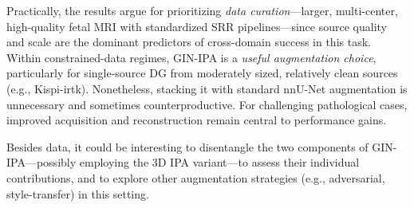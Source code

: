 Practically, the results argue for prioritizing \emph{data curation}---larger, multi-center, high-quality fetal MRI with standardized SRR pipelines---since source quality and scale are the dominant predictors of cross-domain success in this task. Within constrained-data regimes, GIN-IPA is a \emph{useful augmentation choice}, particularly for single-source DG from moderately sized, relatively clean sources (e.g., Kispi-irtk). Nonetheless, stacking it with standard nnU-Net augmentation is unnecessary and sometimes counterproductive. For challenging pathological cases, improved acquisition and reconstruction remain central to performance gains.

Besides data, it could be interesting to disentangle the two components of GIN-IPA---possibly employing the 3D IPA variant---to assess their individual contributions, and to explore other augmentation strategies (e.g., adversarial, style-transfer) in this setting.
